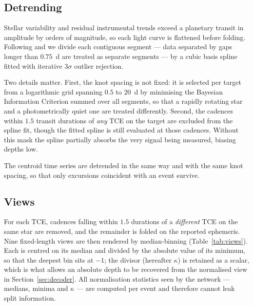 \documentclass[preprint,12pt,authoryear]{elsarticle}
\begin{document}
\subsection{Detrending}

Stellar variability and residual instrumental trends exceed a planetary transit
in amplitude by orders of magnitude, so each light curve is flattened before
folding. Following \citet{Vanderburg2014} and \citet{Shallue2018} we divide each
contiguous segment --- data separated by gaps longer than $0.75$~d are treated
as separate segments --- by a cubic basis spline fitted with iterative
$3\sigma$ outlier rejection.

Two details matter. First, the knot spacing is not fixed: it is selected per
target from a logarithmic grid spanning $0.5$ to $20$~d by minimising the
Bayesian Information Criterion summed over all segments, so that a rapidly
rotating star and a photometrically quiet one are treated differently. Second,
the cadences within $1.5$ transit durations of \emph{any} TCE on the target are
excluded from the spline fit, though the fitted spline is still evaluated at
those cadences. Without this mask the spline partially absorbs the very signal
being measured, biasing depths low.

The centroid time series are detrended in the same way and with the same knot
spacing, so that only excursions coincident with an event survive.

\subsection{Views}
\label{sec:views}

For each TCE, cadences falling within $1.5$ durations of a \emph{different} TCE
on the same star are removed, and the remainder is folded on the reported
ephemeris. Nine fixed-length views are then rendered by median-binning
(Table~\ref{tab:views}). Each is centred on its median and divided by the
absolute value of its minimum, so that the deepest bin sits at $-1$; the divisor
(hereafter $\kappa$) is retained as a scalar, which is what allows an absolute
depth to be recovered from the normalised view in Section~\ref{sec:decoder}.
All normalisation statistics seen by the network --- medians, minima and
$\kappa$ --- are computed per event and therefore cannot leak split information.
\end{document}
